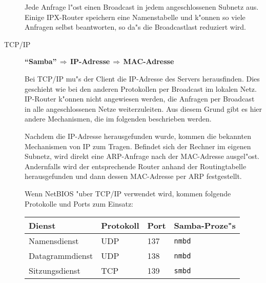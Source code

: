 \documentclass{scrartcl}\usepackage{pslatex}\typearea{12}
\newcommand{\prog}{\texttt}
\begin{document}
\begin{description}
  Jede Anfrage l"ost einen Broadcast in jedem angeschlossenen Subnetz
  aus. Einige IPX-Router speichern eine Namenstabelle und k"onnen so
  viele Anfragen selbst beantworten, so da"s die Broadcastlast
  reduziert wird.

\item[TCP/IP]
  
  \textbf{"`Samba"'$\,\Rightarrow\,$IP-Adresse$\,\Rightarrow\,
    $MAC-Adresse}

  Bei TCP/IP mu"s der Client die IP-Adresse des Servers herausfinden.
  Dies geschieht wie bei den anderen Protokollen per Broadcast im
  lokalen Netz. IP-Router k"onnen nicht angewiesen werden, die
  Anfragen per Broadcast in alle angeschlossenen Netze weiterzuleiten.
  Aus diesem Grund gibt es hier andere Mechanismen, die im folgenden
  beschrieben werden.
  
  Nachdem die IP-Adresse herausgefunden wurde, kommen die bekannten
  Mechanismen von IP zum Tragen. Befindet sich der Rechner im eigenen
  Subnetz, wird direkt eine ARP-Anfrage nach der MAC-Adresse
  ausgel"ost. Andernfalls wird der entsprechende Router anhand der
  Routingtabelle herausgefunden und dann dessen MAC-Adresse per ARP
  festgestellt.
  
  Wenn NetBIOS "uber TCP/IP verwendet wird, kommen folgende Protokolle
  und Ports zum Einsatz:

  \label{protokolle-und-ports}
  \begin{center}\begin{tabular}{|l|l|l|l|}\hline
    Dienst&Protokoll&Port&Samba-Proze"s\\
    \hline\hline
    Namensdienst & UDP &137 & \prog{nmbd} \\\hline
    Datagrammdienst & UDP &138 & \prog{nmbd} \\\hline
    Sitzungsdienst & TCP &139 & \prog{smbd}\\\hline
  \end{tabular}
\end{center}

\end{description}
\end{document}
